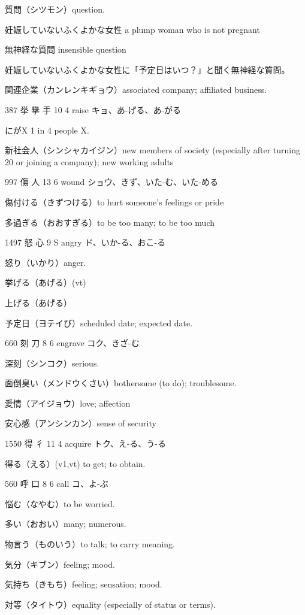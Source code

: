 質問（シツモン）question.

妊娠していないふくよかな女性
a plump woman who is not pregnant

無神経な質問
insensible question

妊娠していないふくよかな女性に「予定日はいつ？」と聞く無神経な質問。

関連企業（カンレンキギョウ）associated company; affiliated business.

387	挙	擧	手	10	4		raise	キョ、あ-げる、あ-がる

にがX 1 in 4 people X.

新社会人（シンシャカイジン）new members of society (especially after turning 20 or joining a company); new working adults

997	傷		人	13	6		wound	ショウ、きず、いた-む、いた-める

傷付ける（きずつける）to hurt someone's feelings or pride

多過ぎる（おおすぎる）to be too many; to be too much

1497	怒		心	9	S		angry	ド、いか-る、おこ-る

怒り（いかり）anger.

挙げる（あげる）(vt)

上げる（あげる）

予定日（ヨテイび）scheduled date; expected date.

660	刻		刀	8	6		engrave	コク、きざ-む

深刻（シンコク）serious.

面倒臭い（メンドウくさい）bothersome (to do); troublesome.

愛情（アイジョウ）love; affection

安心感（アンシンカン）sense of security

1550	得		彳	11	4		acquire	トク、え-る、う-る

得る（える）(v1,vt) to get; to obtain.

560	呼		口	8	6		call	コ、よ-ぶ

悩む（なやむ）to be worried.

多い（おおい）many; numerous.

物言う（ものいう）to talk; to carry meaning.

気分（キブン）feeling; mood.

気持ち（きもち）feeling; sensation; mood.

対等（タイトウ）equality (especially of status or terms).

